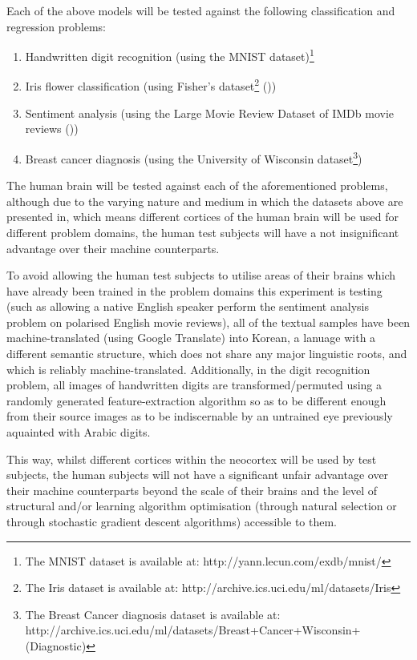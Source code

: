 \documentclass[]{report}
\begin{document}
Each of the above models will be tested against the following classification and regression problems:

\begin{enumerate}
	\item Handwritten digit recognition (using the MNIST dataset)\footnote{The MNIST dataset is available at: http://yann.lecun.com/exdb/mnist/}
	\item Iris flower classification (using Fisher's dataset\footnote{The Iris dataset is available at: http://archive.ics.uci.edu/ml/datasets/Iris} (\cite{uciml2007}))
	\item Sentiment analysis (using the Large Movie Review Dataset of IMDb movie reviews (\cite{maas2011imdb}))
	\item Breast cancer diagnosis (using the University of Wisconsin dataset\footnote{The Breast Cancer diagnosis dataset is available at: http://archive.ics.uci.edu/ml/datasets/Breast+Cancer+Wisconsin+(Diagnostic)})
\end{enumerate}

The human brain will be tested against each of the aforementioned problems, although due to the varying nature and medium in which the datasets above are presented in, which means different cortices of the human brain will be used for different problem domains, the human test subjects will have a not insignificant advantage over their machine counterparts.

To avoid allowing the human test subjects to utilise areas of their brains which have already been trained in the problem domains this experiment is testing (such as allowing a native English speaker perform the sentiment analysis problem on polarised English movie reviews), all of the textual samples have been machine-translated (using Google Translate) into Korean, a lanuage with a different semantic structure, which does not share any major linguistic roots, and which is reliably machine-translated. Additionally, in the digit recognition problem, all images of handwritten digits are transformed/permuted using a randomly generated feature-extraction algorithm so as to be different enough from their source images as to be indiscernable by an untrained eye previously aquainted with Arabic digits.

This way, whilst different cortices within the neocortex will be used by test subjects, the human subjects will not have a significant unfair advantage over their machine counterparts beyond the scale of their brains and the level of structural and/or learning algorithm optimisation (through natural selection or through stochastic gradient descent algorithms) accessible to them.
\end{document}
